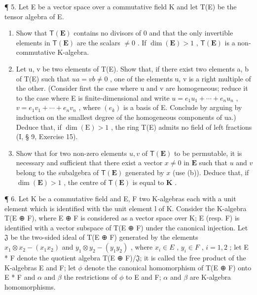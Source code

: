 ¶ 5. Let E be a vector space over a commutative field K and let T(E) be the tensor algebra of E.

\begin{enumerate}
\def\labelenumi{(\alph{enumi})}
\item
  Show that \(\mathsf{T}(\mathbf{E})\) contains no divisors of 0 and that the only invertible elements in \(\mathsf{T}(\mathbf{E})\) are the scalars \(\neq 0\) . If \(\dim (\mathbf{E}) > 1\) , \(\mathsf{T}(\mathbf{E})\) is a non-commutative K-algebra.
\item
  Let u, v be two elements of T(E). Show that, if there exist two elements a, b of T(E) such that \(ua = vb \neq 0\) , one of the elements u, v is a right multiple of the other. (Consider first the case where u and v are homogeneous; reduce it to the case where E is finite-dimensional and write \(u = e_{1}u_{1} + \cdots + e_{n}u_{n}\) , \(v = e_{1}v_{1} + \cdots + e_{n}v_{n}\) , where \((e_{k})\) is a basis of E. Conclude by arguing by induction on the smallest degree of the homogeneous components of ua.) Deduce that, if \(\dim(\mathrm{E}) > 1\) , the ring T(E) admits no field of left fractions (I, § 9, Exercise 15).
\item
  Show that for two non-zero elements \(u, v\) of \(\mathsf{T}(\mathbf{E})\) to be permutable, it is necessary and sufficient that there exist a vector \(x \neq 0\) in \(\mathbf{E}\) such that \(u\) and \(v\) belong to the subalgebra of \(\mathsf{T}(\mathbf{E})\) generated by \(x\) (use (b)). Deduce that, if \(\dim(\mathbf{E}) > 1\) , the centre of \(\mathsf{T}(\mathbf{E})\) is equal to \(\mathbf{K}\) .
\end{enumerate}

¶ 6. Let K be a commutative field and E, F two K-algebras each with a unit element which is identified with the unit element l of K. Consider the K-algebra T(E ⊕ F), where E ⊕ F is considered as a vector space over K; E (resp. F) is identified with a vector subspace of T(E ⊕ F) under the canonical injection. Let \(\mathfrak{J}\) be the two-sided ideal of T(E ⊕ F) generated by the elements \(x_1 \otimes x_2 - (x_1 x_2)\) and \(y_1 \otimes y_2 - (y_1 y_2)\) , where \(x_i \in E\) , \(y_i \in F\) , \(i = 1, 2\) ; let E * F denote the quotient algebra T(E ⊕ F)/\(\mathfrak{J}\); it is called the free product of the K-algebras E and F; let \(\phi\) denote the canonical homomorphism of T(E ⊕ F) onto E * F and \(\alpha\) and \(\beta\) the restrictions of \(\phi\) to E and F; \(\alpha\) and \(\beta\) are K-algebra homomorphisms.

